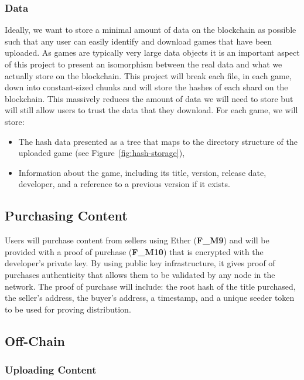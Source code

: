 \subsubsection*{Data}

Ideally, we want to store a minimal amount of data on the blockchain as possible such that any user can easily identify and download games that have been uploaded. As games are typically very large data objects it is an important aspect of this project to present an isomorphism between the real data and what we actually store on the blockchain. This project will break each file, in each game, down into constant-sized chunks and will store the hashes of each shard on the blockchain. This massively reduces the amount of data we will need to store but will still allow users to trust the data that they download.
\x
For each game, we will store:

\begin{itemize}
  \item The hash data presented as a tree that maps to the directory structure of the uploaded game (see Figure~\ref{fig:hash-storage}),
  \item Information about the game, including its title, version, release date, developer, and a reference to a previous version if it exists.
\end{itemize}

\subsection*{Purchasing Content}

Users will purchase content from sellers using Ether (\textbf{F\_M9}) and will be provided with a proof of purchase (\textbf{F\_M10}) that is encrypted with the developer's private key. By using public key infrastructure, it gives proof of purchases authenticity that allows them to be validated by any node in the network.
\x
The proof of purchase will include: the root hash of the title purchased, the seller's address, the buyer's address, a timestamp, and a unique seeder token to be used for proving distribution.

\subsection{Off-Chain}

\subsubsection*{Uploading Content}
\label{subsec:upload-content}

